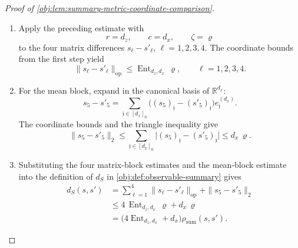 \begin{proof}[Proof of \cref{obj:lem:summary-metric-coordinate-comparison}]
\begin{enumerate}
\item Apply the preceding estimate with
\[
r=d_z,\qquad c=d_x,\qquad \zeta=\varrho
\]
to the four matrix differences \(s_\ell-s'_\ell\), \(\ell=1,2,3,4\).  The
coordinate bounds from the first step yield
\[
\|s_\ell-s'_\ell\|_{\mathrm{op}}
\le
\operatorname{Ent}_{d_z,d_x}\,\varrho,
\qquad \ell=1,2,3,4 .
\]

\item For the mean block, expand in the canonical basis of \(\mathbb R^{d_x}\):
\[
s_5-s'_5
=
\sum_{\mathfrak j\in[d_x]_0}
\bigl((s_5)_{\mathfrak j}-(s'_5)_{\mathfrak j}\bigr)e^{(d_x)}_{\mathfrak j}.
\]
The coordinate bounds and the triangle inequality give
\[
\|s_5-s'_5\|_2
\le
\sum_{\mathfrak j\in[d_x]_0}
\bigl|(s_5)_{\mathfrak j}-(s'_5)_{\mathfrak j}\bigr|
\le
d_x\,\varrho .
\]

\item Substituting the four matrix-block estimates and the mean-block estimate
into the definition of \(d_S\) in \cref{obj:def:observable-summary} gives
\[
\begin{aligned}
d_S(s,s')
&=
\sum_{\ell=1}^{4}\|s_\ell-s'_\ell\|_{\mathrm{op}}
+\|s_5-s'_5\|_2 \\
&\le
4\,\operatorname{Ent}_{d_z,d_x}\,\varrho+d_x\,\varrho \\
&=
\bigl(4\operatorname{Ent}_{d_z,d_x}+d_x\bigr)
\rho_{\mathrm{sum}}(s,s') .
\end{aligned}
\]
\end{enumerate}
\end{proof}
